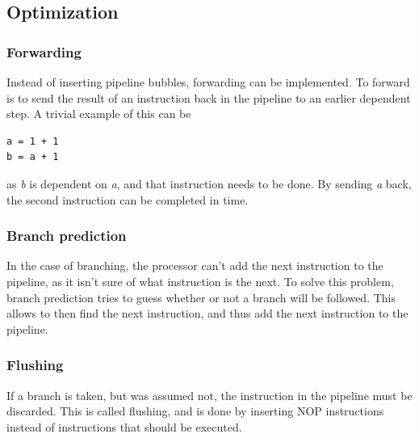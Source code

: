\subsection{Optimization}

\subsubsection*{Forwarding}
Instead of inserting pipeline bubbles, forwarding can be implemented. To forward
is to send the result of an instruction back in the pipeline to an earlier
dependent step. A trivial example of this can be

\begin{verbatim}
a = 1 + 1
b = a + 1
\end{verbatim}

as \textit{b} is dependent on \textit{a}, and that instruction needs to be done.
By sending \textit{a} back, the second instruction can be completed in time.


\subsubsection*{Branch prediction}
In the case of branching, the processor can't add the next instruction to the
pipeline, as it isn't sure of what instruction is the next. To solve this
problem, branch prediction tries to guess whether or not a branch will be
followed. This allows to then find the next instruction, and thus add the next
instruction to the pipeline.


\subsubsection*{Flushing}
If a branch is taken, but was assumed not, the instruction in the pipeline must
be discarded. This is called flushing, and is done by inserting NOP instructions
instead of instructions that should be executed.
